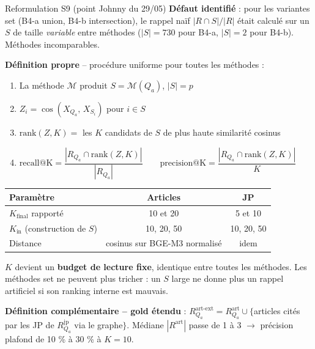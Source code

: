 \documentclass[aspectratio=169,10pt]{beamer}
\newcommand{\keybox}[1]{%
  \begin{center}
  \colorbox{accentsoft}{\parbox{0.92\linewidth}{\centering #1}}
  \end{center}}
\begin{document}
\begin{frame}{Reformulation S9 (point Johnny du 29/05)}
  \scriptsize
  \textbf{Défaut identifié} : pour les variantes set (B4-a union, B4-b intersection),
  le rappel naïf $|R \cap S|/|R|$ était calculé sur un $S$ de taille \emph{variable} entre
  méthodes ($|S|=730$ pour B4-a, $|S|=2$ pour B4-b). Méthodes incomparables.

  \vspace{0.4em}
  \textbf{Définition propre} -- procédure uniforme pour toutes les méthodes :

  \vspace{0.3em}
  \begin{enumerate}\setlength\itemsep{0.15em}
    \item La méthode $\mathcal{M}$ produit $S = \mathcal{M}(Q_a)$, $|S| = p$
    \item $Z_i = \cos(X_{Q_a},\, X_{S_i})$ pour $i \in S$
    \item $\text{rank}(Z, K) = $ les $K$ candidats de $S$ de plus haute similarité cosinus
    \item $\text{recall@K} = \dfrac{|R_{Q_a} \cap \text{rank}(Z, K)|}{|R_{Q_a}|}
           \qquad \text{precision@K} = \dfrac{|R_{Q_a} \cap \text{rank}(Z, K)|}{K}$
  \end{enumerate}

  \vspace{0.4em}
  \begin{center}
  \renewcommand{\arraystretch}{1.2}
  \begin{tabular}{@{}l c c@{}}
    \toprule
    \textbf{Paramètre} & \textbf{Articles} & \textbf{JP} \\
    \midrule
    $K_{\text{final}}$ rapporté & 10 et 20 & 5 et 10 \\
    $K_{\text{in}}$ (construction de $S$) & 10, 20, 50 & 10, 20, 50 \\
    Distance & cosinus sur BGE-M3 normalisé & idem \\
    \bottomrule
  \end{tabular}
  \end{center}

  \vspace{0.3em}
  \keybox{$K$ devient un \textbf{budget de lecture fixe}, identique entre toutes les méthodes.
  Les méthodes set ne peuvent plus tricher : un $S$ large ne donne plus un rappel artificiel
  si son ranking interne est mauvais.}

  \vspace{0.3em}
  \textbf{Définition complémentaire -- gold étendu} : $R^{\text{art-ext}}_{Q_a} = R^{\text{art}}_{Q_a} \cup \{$articles cités par les JP de $R^{\text{jp}}_{Q_a}$ via le graphe$\}$. Médiane $|R^{\text{art}}|$ passe de 1 à 3 $\to$ précision plafond de 10 \% à 30 \% à $K{=}10$.
\end{frame}
\end{document}
